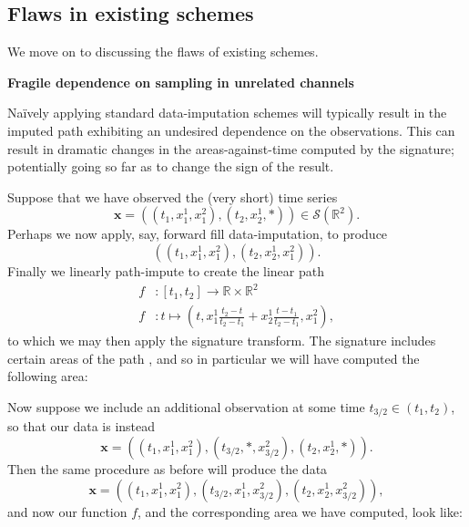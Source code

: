 \documentclass{article}
\renewcommand{\subsubsection}[1]{\textbf{#1}

} %
\newcommand{\reals}{\mathbb{R}}
\newcommand{\seriesspace}{\mathcal{S}}
\begin{document}
\subsection{Flaws in existing schemes}\label{section:flaws}
We move on to discussing the flaws of existing schemes.

\subsubsection{Fragile dependence on sampling in unrelated channels}
Na{\"i}vely applying standard data-imputation schemes will typically result in the imputed path exhibiting an undesired dependence on the observations. This can result in dramatic changes in the areas-against-time computed by the signature; potentially going so far as to change the sign of the result.

Suppose that we have observed the (very short) time series
\begin{equation}\label{eq:flaw1}
    \mathbf{x} = ((t_1, x_1^1, x_1^2), (t_2, x_2^1, *)) \in \seriesspace(\reals^2).
\end{equation}
Perhaps we now apply, say, forward fill data-imputation, to produce
\begin{equation*}
    ((t_1, x_1^1, x_1^2), (t_2, x_2^1, x_1^2)).
\end{equation*}
Finally we linearly path-impute to create the linear path
\begin{align*}
    f &\colon [t_1, t_2] \to \reals \times \reals^2\\
    f &\colon t \mapsto (t, x_1^1\frac{t_2 - t}{t_2 - t_1} + x_2^1\frac{t - t_1}{t_2 - t_1}, x_1^2),
\end{align*}
to which we may then apply the signature transform. The signature includes certain areas of the path \citep{iisignature,fermanian2019embedding}, and so in particular we will have computed the following area:

Now suppose we include an additional observation at some time $t_{3/2} \in (t_1, t_2)$, so that our data is instead
\begin{equation}\label{eq:flaw2}
    \mathbf{x} = ((t_1, x_1^1, x_1^2), (t_{3/2}, *, x_{3/2}^2), (t_2, x_2^1, *)).
\end{equation}
Then the same procedure as before will produce the data
\begin{equation*}
    \mathbf{x} = ((t_1, x_1^1, x_1^2), (t_{3/2}, x_1^1, x_{3/2}^2), (t_2, x_2^1, x_{3/2}^2)),
\end{equation*}
and now our function $f$, and the corresponding area we have computed, look like:
\end{document}
